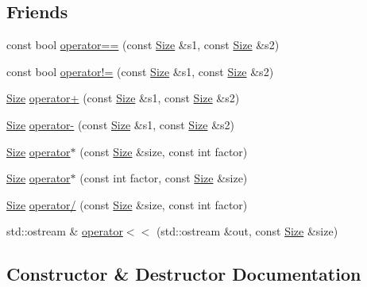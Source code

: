 \subsection*{Friends}
\begin{DoxyCompactItemize}
\item 
const bool \hyperlink{classprism_1_1geometry_1_1_size_a0ecba9b1ddf7508ab7d47f24fccc5b2c}{operator==} (const \hyperlink{classprism_1_1geometry_1_1_size}{Size} \&s1, const \hyperlink{classprism_1_1geometry_1_1_size}{Size} \&s2)
\item 
const bool \hyperlink{classprism_1_1geometry_1_1_size_a766b0bce48ef4987bde75192bc2703ee}{operator!=} (const \hyperlink{classprism_1_1geometry_1_1_size}{Size} \&s1, const \hyperlink{classprism_1_1geometry_1_1_size}{Size} \&s2)
\item 
\hyperlink{classprism_1_1geometry_1_1_size}{Size} \hyperlink{classprism_1_1geometry_1_1_size_a8a42e08734218778f68f34d79f9c8130}{operator+} (const \hyperlink{classprism_1_1geometry_1_1_size}{Size} \&s1, const \hyperlink{classprism_1_1geometry_1_1_size}{Size} \&s2)
\item 
\hyperlink{classprism_1_1geometry_1_1_size}{Size} \hyperlink{classprism_1_1geometry_1_1_size_ac19f7036b22c72ce81d89025af2510f0}{operator-\/} (const \hyperlink{classprism_1_1geometry_1_1_size}{Size} \&s1, const \hyperlink{classprism_1_1geometry_1_1_size}{Size} \&s2)
\item 
\hyperlink{classprism_1_1geometry_1_1_size}{Size} \hyperlink{classprism_1_1geometry_1_1_size_a159c2e1e3dcb9ee6c1c681533f2c0d36}{operator$\ast$} (const \hyperlink{classprism_1_1geometry_1_1_size}{Size} \&size, const int factor)
\item 
\hyperlink{classprism_1_1geometry_1_1_size}{Size} \hyperlink{classprism_1_1geometry_1_1_size_a9e8c3a611d6cff45b435eb6439cf5e2e}{operator$\ast$} (const int factor, const \hyperlink{classprism_1_1geometry_1_1_size}{Size} \&size)
\item 
\hyperlink{classprism_1_1geometry_1_1_size}{Size} \hyperlink{classprism_1_1geometry_1_1_size_a54c78dfe93394bb7069b0880a3183909}{operator/} (const \hyperlink{classprism_1_1geometry_1_1_size}{Size} \&size, const int factor)
\item 
std\+::ostream \& \hyperlink{classprism_1_1geometry_1_1_size_a8e7b189b7bed4a1acb084ff4cd0cf2a6}{operator$<$$<$} (std\+::ostream \&out, const \hyperlink{classprism_1_1geometry_1_1_size}{Size} \&size)
\end{DoxyCompactItemize}


\subsection{Constructor \& Destructor Documentation}
